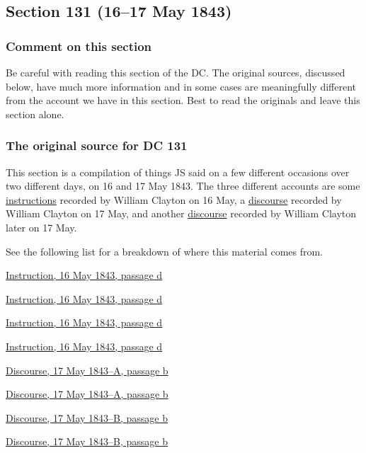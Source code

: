 \subsection{Section 131 (16--17 May 1843)}
	\label{DC131}
	
	\subsubsection{Comment on this section}
	
		Be careful with reading this section of the DC. The original sources, discussed below, have much more information and in some cases are meaningfully different from the account we have in this section. Best to read the originals and leave this section alone.
	
	\subsubsection{The original source for DC 131}
	
		This section is a compilation of things JS said on a few different occasions over two different days, on 16 and 17 May 1843. The three different accounts are some \hyperref[EMS-1843-JS-16-MAY-1843-WC]{instructions} recorded by William Clayton on 16 May, a \hyperref[EMS-1843-JS-17-MAY-1843-A-WC]{discourse} recorded by William Clayton on 17 May, and another \hyperref[EMS-1843-JS-17-MAY-1843-B-WC]{discourse} recorded by William Clayton later on 17 May.
		
		See the following list for a breakdown of where this material comes from.
		
		\begin{compactdesc}
			\item[Verse 1] \hyperlink{EMS-1843-JS-16-MAY-1843-WC-d}{Instruction, 16 May 1843, passage d}
			\item[Verse 2] \hyperlink{EMS-1843-JS-16-MAY-1843-WC-d}{Instruction, 16 May 1843, passage d}
			\item[Verse 3] \hyperlink{EMS-1843-JS-16-MAY-1843-WC-d}{Instruction, 16 May 1843, passage d}
			\item[Verse 4] \hyperlink{EMS-1843-JS-16-MAY-1843-WC-d}{Instruction, 16 May 1843, passage d}
			\item[Verse 5] \hyperlink{EMS-1843-JS-17-MAY-1843-A-WC-b}{Discourse, 17 May 1843--A, passage b}
			\item[Verse 6] \hyperlink{EMS-1843-JS-17-MAY-1843-A-WC-b}{Discourse, 17 May 1843--A, passage b}
			\item[Verse 7] \hyperlink{EMS-1843-JS-17-MAY-1843-B-WC-b}{Discourse, 17 May 1843--B, passage b}
			\item[Verse 8] \hyperlink{EMS-1843-JS-17-MAY-1843-B-WC-b}{Discourse, 17 May 1843--B, passage b}
		\end{compactdesc}
	
